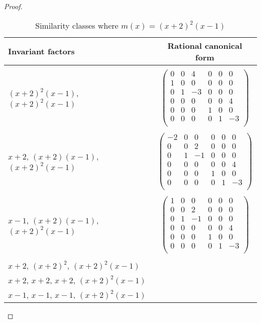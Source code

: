 \documentclass{article}
\begin{document}
\begin{proof}
    \begin{table}[h]
    \centering
    \begin{tabular}{lc}
      Invariant factors &Rational canonical form\\\hline\\
      $(x+2)^2(x-1)$, $(x+2)^2(x-1)$
        &$\begin{pmatrix}
          0&0&4&0&0&0\\
          1&0&0&0&0&0\\
          0&1&-3&0&0&0\\
          0&0&0&0&0&4\\
          0&0&0&1&0&0\\
          0&0&0&0&1&-3\\
        \end{pmatrix}$\\\\
      $x+2$, $(x+2)(x-1)$, $(x+2)^2(x-1)$
        &$\begin{pmatrix}
          -2&0&0&0&0&0\\
          0&0&2&0&0&0\\
          0&1&-1&0&0&0\\
          0&0&0&0&0&4\\
          0&0&0&1&0&0\\
          0&0&0&0&1&-3\\
        \end{pmatrix}$\\\\
      $x-1$, $(x+2)(x-1)$, $(x+2)^2(x-1)$
        &$\begin{pmatrix}
          1&0&0&0&0&0\\
          0&0&2&0&0&0\\
          0&1&-1&0&0&0\\
          0&0&0&0&0&4\\
          0&0&0&1&0&0\\
          0&0&0&0&1&-3\\
        \end{pmatrix}$\\\\
      $x+2$, $(x+2)^2$, $(x+2)^2(x-1)$&\\
      $x+2$, $x+2$, $x+2$, $(x+2)^2(x-1)$&\\
      $x-1$, $x-1$, $x-1$, $(x+2)^2(x-1)$&\\
    \end{tabular}
    \caption{Similarity classes where $m(x)=(x+2)^2(x-1)$}
    \label{tbl:classes}
    \end{table}
  \end{proof}
\end{document}
